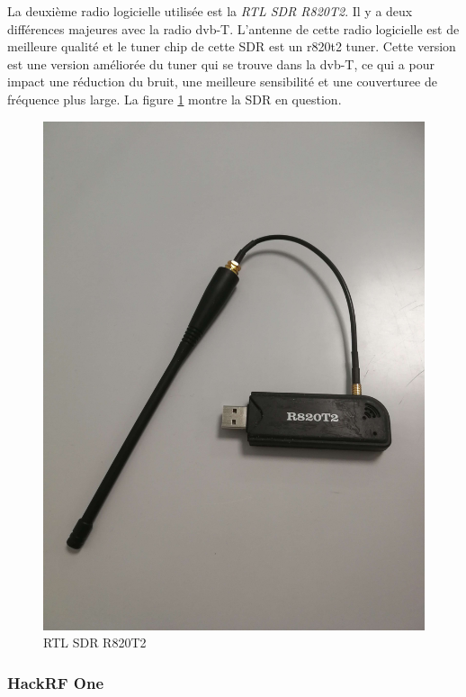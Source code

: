 La deuxième radio logicielle utilisée est la \textit{RTL SDR R820T2}. Il y a deux différences majeures avec la radio dvb-T. L'antenne de cette radio logicielle est de meilleure qualité et le tuner chip de cette SDR est un r820t2 tuner. Cette version est une version améliorée du tuner qui se trouve dans la dvb-T, ce qui a pour impact une réduction du bruit, une meilleure sensibilité et une couverturee de fréquence plus large. La figure \ref{term32} montre la SDR en question.


\begin{figure}[h]
\centering

\includegraphics[scale=0.08]{images/r820t2.png}
\caption{RTL SDR R820T2}\label{term32}
\end{figure}

\newpage


\subsubsection{HackRF One}

